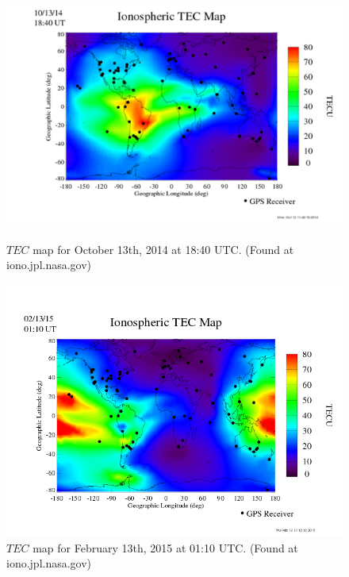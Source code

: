 \begin{figure}[htb]
\centering
\begin{minipage}[b]{0.48\textwidth}
\centering
\includegraphics[width=0.95\linewidth]{Ionosphere/figures/TEC_map_20141013_18-40UT.png}
\caption{$TEC$ map for October 13th, 2014 at 18:40 UTC. (Found at iono.jpl.nasa.gov)  }
\label{Fig:fall_tec_global}
\end{minipage}%
\begin{minipage}[b]{0.02\textwidth}
\hspace{1cm}
\end{minipage}%
\begin{minipage}[b]{0.48\textwidth}
\centering
\includegraphics[width=0.95\linewidth]{Ionosphere/figures/TEC_map_20150213_01-10UT.png}
\caption{$TEC$ map for February 13th, 2015 at 01:10 UTC. (Found at iono.jpl.nasa.gov)  }
\label{Fig:winter_tec_global}
\end{minipage}
\end{figure}



